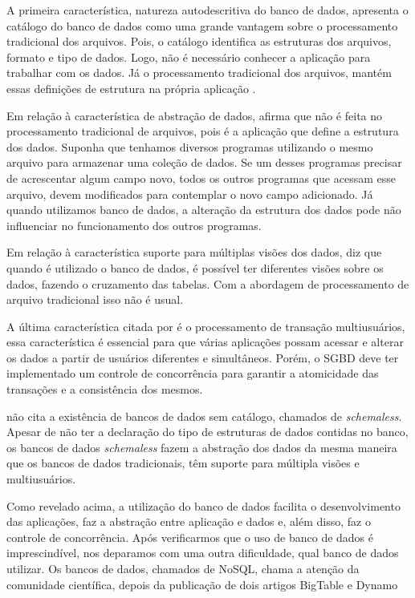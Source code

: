 A primeira característica, natureza autodescritiva do banco de dados, apresenta o catálogo do banco de dados como uma grande vantagem sobre o processamento tradicional dos arquivos. Pois, o catálogo identifica as estruturas dos arquivos, formato e tipo de dados. Logo, não é necessário conhecer a aplicação para trabalhar com os dados. Já  o processamento tradicional dos arquivos, mantém essas definições de estrutura na própria aplicação \cite{Elmasri}.


Em relação à característica de abstração de dados,  afirma que não é feita no processamento tradicional de arquivos, pois é a aplicação que define a estrutura dos dados. Suponha que tenhamos diversos programas utilizando o mesmo arquivo para armazenar uma coleção de dados. Se um desses programas precisar de acrescentar algum campo novo, todos os outros programas que acessam esse arquivo, devem modificados para contemplar o novo campo adicionado. Já quando utilizamos banco de dados, a alteração da estrutura dos dados pode não influenciar no funcionamento dos outros programas.

Em relação à característica suporte para múltiplas visões dos dados,  diz que quando é utilizado o banco de dados, é possível ter diferentes visões sobre os dados, fazendo o cruzamento das tabelas. Com a abordagem de processamento de arquivo tradicional isso não é usual.

A última característica citada por  é o processamento de transação multiusuários, essa característica é essencial para que várias aplicações possam acessar e alterar os dados a partir de usuários diferentes e simultâneos. Porém, o \ac{SGBD} deve ter implementado um controle de concorrência para garantir a atomicidade das transações e a consistência dos mesmos.

 não cita a existência de bancos de dados sem catálogo, chamados de \textit{schemaless}. Apesar de não ter a declaração do tipo de estruturas de dados contidas no banco, os bancos de dados \textit{schemaless} fazem a abstração dos dados da mesma maneira que os bancos de dados tradicionais, têm suporte para múltipla visões e multiusuários.

Como revelado acima, a utilização do banco de dados facilita o desenvolvimento das aplicações, faz a abstração entre aplicação e dados e, além disso, faz o controle de concorrência. Após verificarmos que o uso de banco de dados é imprescindível, nos deparamos com uma outra dificuldade, qual banco de dados utilizar. Os bancos de dados, chamados de NoSQL, chama a atenção da comunidade científica, depois da publicação de dois artigos BigTable \cite{bigtable} e Dynamo \cite{dynamo}

